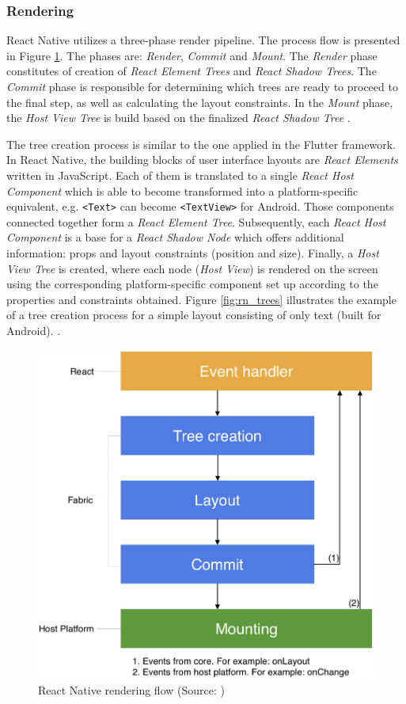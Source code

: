 \subsubsection*{Rendering}

React Native utilizes a three-phase render pipeline. The process flow is presented in Figure \ref{fig:rn_render_flow}. The phases are: \emph{Render}, \emph{Commit} and \emph{Mount}. The \emph{Render} phase constitutes of creation of \emph{React Element Trees} and \emph{React Shadow Trees}. The \emph{Commit} phase is responsible for determining which trees are ready to proceed to the final step, as well as calculating the layout constraints. In the \emph{Mount} phase, the \emph{Host View Tree} is build based on the finalized \emph{React Shadow Tree} \cite{react_native_docs_render}.

The tree creation process is similar to the one applied in the Flutter framework. In React Native, the building blocks of user interface layouts are \emph{React Elements} written in JavaScript. Each of them is translated to a single \emph{React Host Component} which is able to become transformed into a platform-specific equivalent, e.g. \texttt{<Text>} can become \texttt{<TextView>} for Android. Those components connected together form a \emph{React Element Tree}. Subsequently, each \emph{React Host Component} is a base for a \emph{React Shadow Node} which offers additional information: props and layout constraints (position and size). Finally, a \emph{Host View Tree} is created, where each node (\emph{Host View}) is rendered on the screen using the corresponding platform-specific component set up according to the properties and constraints obtained. Figure \ref{fig:rn_trees} illustrates the  example of a tree creation process for a simple layout consisting of only text (built for Android). \cite{react_native_docs_render}.

\begin{figure}[h]
    \centering
    \includegraphics[width=.55\textwidth]{img/rn_render}
    \caption{React Native rendering flow (Source: \cite{react_native_docs_render})}
    \label{fig:rn_render_flow}
\end{figure}

